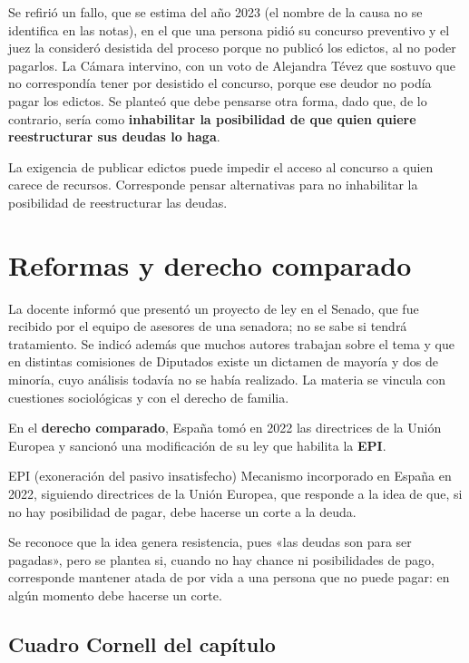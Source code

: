 \documentclass[12pt,oneside]{book}
\begin{document}
Se refirió un fallo, que se estima del año 2023 (el nombre de la causa no se identifica en las notas), en el que una persona pidió su concurso preventivo y el juez la consideró desistida del proceso porque no publicó los edictos, al no poder pagarlos. La Cámara intervino, con un voto de Alejandra Tévez que sostuvo que no correspondía tener por desistido el concurso, porque ese deudor no podía pagar los edictos. Se planteó que debe pensarse otra forma, dado que, de lo contrario, sería como \textbf{inhabilitar la posibilidad de que quien quiere reestructurar sus deudas lo haga}.

\begin{important}
La exigencia de publicar edictos puede impedir el acceso al concurso a quien carece de recursos. Corresponde pensar alternativas para no inhabilitar la posibilidad de reestructurar las deudas.
\end{important}

\section{Reformas y derecho comparado}

La docente informó que presentó un proyecto de ley en el Senado, que fue recibido por el equipo de asesores de una senadora; no se sabe si tendrá tratamiento. Se indicó además que muchos autores trabajan sobre el tema y que en distintas comisiones de Diputados existe un dictamen de mayoría y dos de minoría, cuyo análisis todavía no se había realizado. La materia se vincula con cuestiones sociológicas y con el derecho de familia.

En el \textbf{derecho comparado}, España tomó en 2022 las directrices de la Unión Europea y sancionó una modificación de su ley que habilita la \textbf{EPI}.

\begin{definition}{EPI (exoneración del pasivo insatisfecho)}
Mecanismo incorporado en España en 2022, siguiendo directrices de la Unión Europea, que responde a la idea de que, si no hay posibilidad de pagar, debe hacerse un corte a la deuda.
\end{definition}

Se reconoce que la idea genera resistencia, pues «las deudas son para ser pagadas», pero se plantea si, cuando no hay chance ni posibilidades de pago, corresponde mantener atada de por vida a una persona que no puede pagar: en algún momento debe hacerse un corte.

\subsection*{Cuadro Cornell del capítulo}
\end{document}
